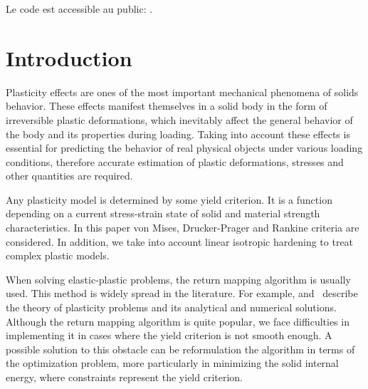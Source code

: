 \documentclass[12pt]{article}
\begin{document}
Le code est accessible au public: \parencite{convex-plasticity}.

\renewcommand{\contentsname}{\centering Table of contents}
\renewcommand{\listtablename}{\centering List of tables}
\renewcommand{\listfigurename}{\centering List of figures}

\newpage
\tableofcontents
\newpage
{}
{}
\listoftables
\newpage
{}
{}
\listoffigures

\newpage
{}
{}
\section*{Introduction}
Plasticity effects are ones of the most important mechanical phenomena of solids behavior. These effects manifest themselves in a solid body in the form of irreversible plastic deformations, which inevitably affect the general behavior of the body and its properties during loading. Taking into account these effects is essential for predicting the behavior of real physical objects under various loading conditions, therefore accurate estimation of plastic deformations, stresses and other quantities are required.

Any plasticity model is determined by some yield criterion. It is a function depending on a current stress-strain state of solid and material strength characteristics. In this paper von Mises, Drucker-Prager and Rankine criteria are considered. In addition, we take into account linear isotropic hardening to treat complex plastic models.

When solving elastic-plastic problems, the return mapping algorithm is usually used. This method is widely spread in the literature. For example, \textcite{bonnet:hal-01083772} and~\textcite{nonlinear_FEM2012} describe the theory of plasticity problems and its analytical and numerical solutions. Although the return mapping algorithm is quite popular, we face difficulties in implementing it in cases where the yield criterion is not smooth enough. A possible solution to this obstacle can be reformulation the algorithm in terms of the optimization problem, more particularly in minimizing the solid internal energy, where constraints represent the yield criterion.
\end{document}
